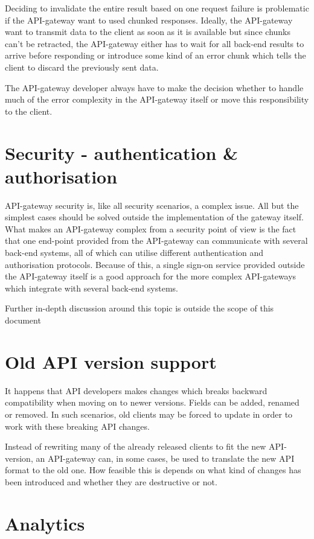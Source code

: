 \documentclass{cslthse-msc}
\begin{document}
Deciding to invalidate the entire result based on one request failure is problematic if the API-gateway want to used chunked responses. Ideally, the API-gateway want to transmit data to the client as soon as it is available but since chunks can't be retracted, the API-gateway either has to wait for all back-end results to arrive before responding or introduce some kind of an error chunk which tells the client to discard the previously sent data.

The API-gateway developer always have to make the decision whether to handle much of the error complexity in the API-gateway itself or move this responsibility to the client.

\section{Security - authentication \& authorisation}
\label{sec:security}
API-gateway security is, like all security scenarios, a complex issue. All but the simplest cases should be solved outside the implementation of the gateway itself. What makes an API-gateway complex from a security point of view is the fact that one end-point provided from the API-gateway can communicate with several back-end systems, all of which can utilise different authentication and authorisation protocols. Because of this, a single sign-on service provided outside the API-gateway itself is a good approach for the more complex API-gateways which integrate with several back-end systems.

Further in-depth discussion around this topic is outside the scope of this document

\section{Old API version support}

It happens that API developers makes changes which breaks backward compatibility when moving on to newer versions. Fields can be added, renamed or removed. In such scenarios, old clients may be forced to update in order to work with these breaking API changes.

Instead of rewriting many of the already released clients to fit the new API-version, an API-gateway can, in some cases, be used to translate the new API format to the old one. How feasible this is depends on what kind of changes has been introduced and whether they are destructive or not.

\section{Analytics}
\end{document}
